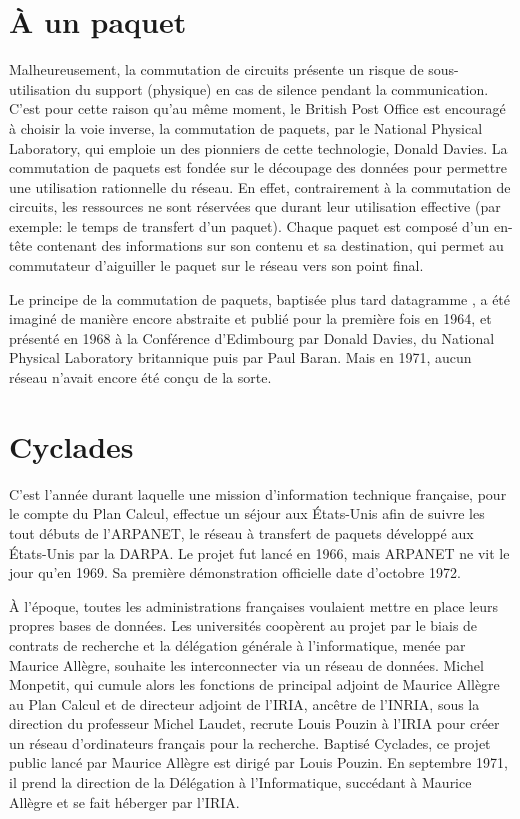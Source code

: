 \documentclass[12pt]{report}
\begin{document}
\section{À un paquet}

Malheureusement, la commutation de circuits présente un risque de sous-utilisation du support (physique) en cas de \og silence \fg{} pendant la communication.
C'est pour cette raison qu'au même moment, le British Post Office est encouragé à choisir la voie inverse, la commutation de paquets, par le National Physical Laboratory, qui emploie un des pionniers de cette technologie, Donald Davies. La commutation de paquets est fondée sur le découpage des données pour permettre une utilisation rationnelle du réseau. En effet, contrairement à la commutation de circuits, les ressources ne sont réservées que durant leur utilisation effective (par exemple: le temps de transfert d'un paquet). Chaque paquet est composé d'un en-tête contenant des informations sur son contenu et sa destination, qui permet au commutateur d'aiguiller le paquet sur le réseau vers son point final\cite{wikicp}.

Le principe de la commutation de paquets, baptisée plus tard \og datagramme \fg, a été imaginé de manière encore abstraite et publié pour la première fois en 1964, et présenté en 1968 à la Conférence d'Edimbourg par Donald Davies, du National Physical Laboratory britannique puis par Paul Baran. Mais en 1971, aucun réseau n'avait encore été conçu de la sorte.

\section{Cyclades}


C'est l'année durant laquelle une mission d'information technique française, pour le compte du Plan Calcul, effectue un séjour aux États-Unis afin de suivre les tout débuts de l'\gls{ARPANET}, le réseau à transfert de paquets développé aux États-Unis par la \gls{DARPA}. Le projet fut lancé en 1966, mais ARPANET ne vit le jour qu'en 1969. Sa première démonstration officielle date d'octobre 1972\cite{wikiarpa}.

À l'époque, toutes les administrations françaises voulaient mettre en place leurs propres bases de données. Les universités coopèrent au projet par le biais de contrats de recherche et la délégation générale à l'informatique, menée par Maurice Allègre, souhaite les interconnecter via un réseau de données. Michel Monpetit, qui cumule alors les fonctions de principal adjoint de Maurice Allègre au Plan Calcul et de directeur adjoint de l'IRIA, ancêtre de l'\gls{INRIA}, sous la direction du professeur Michel Laudet, recrute Louis Pouzin à l'IRIA pour créer un réseau d'ordinateurs français pour la recherche. Baptisé Cyclades, ce projet public lancé par Maurice Allègre est dirigé par Louis Pouzin. En septembre 1971, il prend la direction de la Délégation à l’Informatique, succédant à Maurice Allègre et se fait héberger par l’IRIA\cite{wikicyc}.
\end{document}
